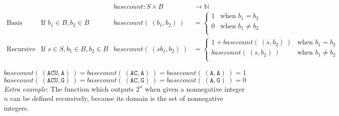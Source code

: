 \documentclass[12pt, oneside]{article}
\newcommand{\A}[0]{\texttt{A}}
\newcommand{\C}[0]{\texttt{C}}
\newcommand{\G}[0]{\texttt{G}}
\newcommand{\U}[0]{\texttt{U}}
\begin{document}
\[
\begin{array}{llll}
& & \textit{basecount} : S \times B & \to \mathbb{N} \\
\textrm{Basis Step:} &  \textrm{If } b_1 \in B, b_2 \in B & \textit{basecount}(~(b_1, b_2)~) & =
        \begin{cases}
            1 & \textrm{when } b_1 = b_2 \\
            0 & \textrm{when } b_1 \neq b_2 \\
        \end{cases} \\
\textrm{Recursive Step:} & \textrm{If } s \in S, b_1 \in B, b_2 \in B &\textit{basecount}(~(s b_1, b_2)~) & =
        \begin{cases}
            1 + \textit{basecount}(~(s, b_2)~) & \textrm{when } b_1 = b_2 \\
            \textit{basecount}(~(s, b_2)~) & \textrm{when } b_1 \neq b_2 \\
        \end{cases}
\end{array}
\]

$basecount(~(\A\C\U,\A)~) = basecount( ~(\A\C, \A)~) = basecount(~(\A, \A)~) = 1$\\


$basecount(~(\A\C\U,\G)~) = basecount( ~(\A\C, \G)~) = basecount(~(\A, \G)~) = 0$\\


\vfill
{\it Extra example}: The function which outputs $2^n$ when given a nonnegative integer $n$ can be defined recursively, 
because its domain is the set of nonnegative integers.

\vfill
 \newpage
\end{document}
